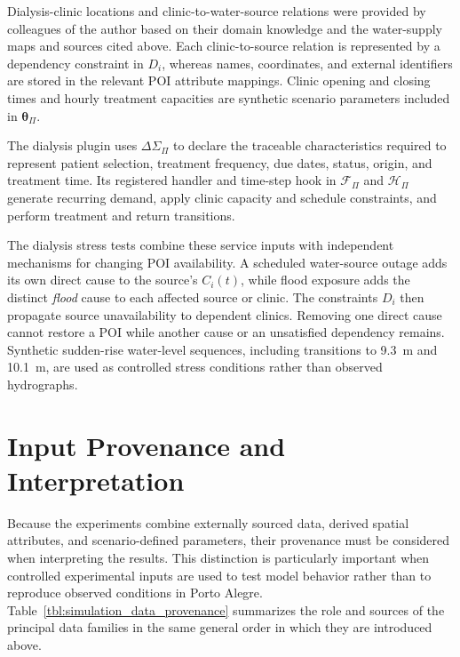 Dialysis-clinic locations and clinic-to-water-source relations were provided by colleagues of the author based on their domain knowledge and the water-supply maps and sources cited above. Each clinic-to-source relation is represented by a dependency constraint in $D_i$, whereas names, coordinates, and external identifiers are stored in the relevant POI attribute mappings. Clinic opening and closing times and hourly treatment capacities are synthetic scenario parameters included in $\bm{\theta}_{\Pi}$.

The dialysis plugin uses $\Delta\Sigma_{\Pi}$ to declare the traceable characteristics required to represent patient selection, treatment frequency, due dates, status, origin, and treatment time. Its registered handler and time-step hook in $\mathcal{F}_{\Pi}$ and $\mathcal{H}_{\Pi}$ generate recurring demand, apply clinic capacity and schedule constraints, and perform treatment and return transitions.

The dialysis stress tests combine these service inputs with independent mechanisms for changing POI availability. A scheduled water-source outage adds its own direct cause to the source's $C_i(t)$, while flood exposure adds the distinct \textit{flood} cause to each affected source or clinic. The constraints $D_i$ then propagate source unavailability to dependent clinics. Removing one direct cause cannot restore a POI while another cause or an unsatisfied dependency remains. Synthetic sudden-rise water-level sequences, including transitions to 9.3~m and 10.1~m, are used as controlled stress conditions rather than observed hydrographs.


\section{Input Provenance and Interpretation}
\label{sec:input_provenance_summary}

Because the experiments combine externally sourced data, derived spatial attributes, and scenario-defined parameters, their provenance must be considered when interpreting the results. This distinction is particularly important when controlled experimental inputs are used to test model behavior rather than to reproduce observed conditions in Porto Alegre.
Table~\ref{tbl:simulation_data_provenance} summarizes the role and sources of the principal data families in the same general order in which they are introduced above.

